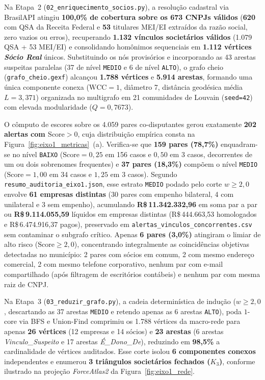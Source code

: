 Na Etapa~2 (\texttt{02\_\allowbreak enriquecimento\_\allowbreak socios.py}), a resolução cadastral via BrasilAPI atingiu \textbf{100,0\% de cobertura sobre os 673 CNPJs válidos} (\textbf{620} com QSA da Receita Federal e \textbf{53} titulares MEI/EI extraídos da razão social, zero vazios ou erros), recuperando \textbf{1.132 vínculos societários válidos} (1.079 QSA + 53 MEI/EI) e consolidando homônimos sequenciais em \textbf{1.112 vértices \textit{Sócio Real}} únicos. Substituindo os nós provisórios e incorporando as 43 arestas suspeitas paralelas (37 de nível \texttt{MEDIO} e 6 de nível \texttt{ALTO}), o grafo cheio (\texttt{grafo\_\allowbreak cheio.gexf}) alcançou \textbf{1.788 vértices} e \textbf{5.914 arestas}, formando uma única componente conexa ($\text{WCC}=1$, diâmetro 7, distância geodésica média $L=3{,}371$) organizada no multigrafo em 21 comunidades de Louvain (\texttt{seed=42}) com elevada modularidade ($Q=0{,}7673$).

O cômputo de escores sobre os 4.059 pares co-disputantes gerou exatamente \textbf{202 alertas com $\text{Score} > 0$}, cuja distribuição empírica consta na Figura~\ref{fig:eixo1_metricas}~(a). Verifica-se que \textbf{159 pares (78,7\%)} enquadram-se no nível \texttt{BAIXO} ($\text{Score}=0{,}25$ em 156 casos e $0{,}50$ em 3 casos, decorrentes de um ou dois sobrenomes frequentes) e \textbf{37 pares (18,3\%)} compõem o nível \texttt{MEDIO} ($\text{Score}=1{,}00$ em 34 casos e $1{,}25$ em 3 casos). Segundo \texttt{resumo\_\allowbreak auditoria\_\allowbreak eixo1\allowbreak .json}, esse estrato \texttt{MEDIO} podado pelo corte $w \ge 2{,}0$ envolve \textbf{61 empresas distintas} (30 pares com empenho bilateral, 4 com unilateral e 3 sem empenho), acumulando \textbf{R\$\,11.342.332,96} em soma par a par ou \textbf{R\$\,9.114.055,59} líquidos em empresas distintas (R\$\,444.663,53 homologados e R\$\,6.474.916,37 pagos), preservado em \texttt{alertas\_\allowbreak vinculos\_\allowbreak concorrentes\allowbreak .csv} sem contaminar o subgrafo crítico. Apenas \textbf{6 pares (3,0\%)} atingiram o limiar de alto risco ($\text{Score} \ge 2{,}0$), concentrando integralmente as coincidências objetivas detectadas no município: 2 pares com sócios em comum, 2 com mesmo endereço comercial, 2 com mesmo telefone corporativo, nenhum par com e-mail compartilhado (após filtragem de escritórios contábeis) e nenhum par com mesma raiz de CNPJ.

Na Etapa~3 (\texttt{03\_\allowbreak reduzir\_\allowbreak grafo.py}), a cadeia determinística de indução ($w \ge 2{,}0$, descartando as 37 arestas \texttt{MEDIO} e retendo apenas as 6 arestas \texttt{ALTO}), poda $1$-core via BFS e Union-Find comprimiu os 1.788 vértices da macro-rede para apenas \textbf{26 vértices} (12 empresas e 14 sócios) e \textbf{23 arestas} (6 arestas \textit{Vinculo\_\allowbreak Suspeito} e 17 arestas \textit{É\_\allowbreak Dono\_\allowbreak De}), reduzindo em \textbf{98,5\%} a cardinalidade de vértices auditados. Esse corte isolou \textbf{6 componentes conexos} independentes e enumerou \textbf{3 triângulos societários fechados ($K_3$)}, conforme ilustrado na projeção \textit{ForceAtlas2} da Figura~\ref{fig:eixo1_rede}.

